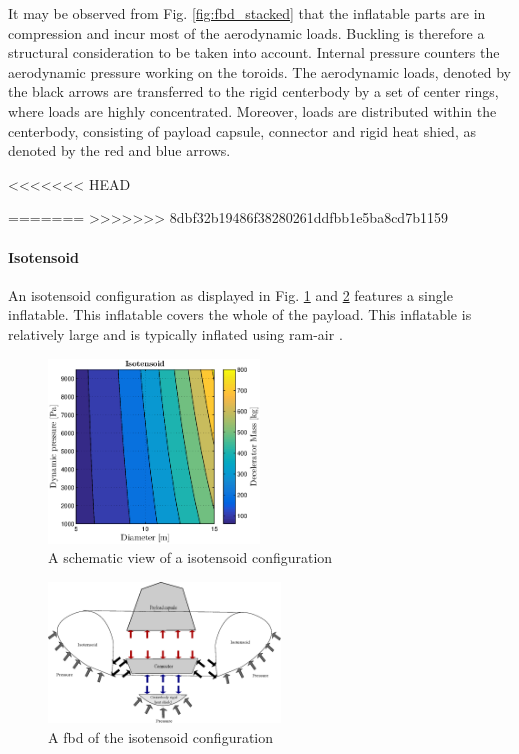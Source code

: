 It may be observed from Fig. \ref{fig:fbd_stacked} that the inflatable parts are in compression and incur most of the aerodynamic loads. Buckling is therefore a structural consideration to be taken into account. Internal pressure counters the aerodynamic pressure working on the toroids. The aerodynamic loads, denoted by the black arrows are transferred to the rigid centerbody by a set of center rings, where loads are highly concentrated. Moreover, loads are distributed within the centerbody, consisting of payload capsule, connector and rigid heat shied, as denoted by the red and blue arrows.

<<<<<<< HEAD

=======
>>>>>>> 8dbf32b19486f38280261ddfbb1e5ba8cd7b1159
\paragraph{Isotensoid}

An isotensoid configuration as displayed in Fig. \ref{fig:conc_iso} and \ref{fig:fbd_iso} features a single inflatable. This inflatable covers the whole of the payload. This inflatable is relatively large and is typically inflated using ram-air \cite{Smith2011}. 

\begin{figure}[H]
\centering
\includegraphics[width = 0.5\textwidth]{Figure/ISO_comp.eps}
\caption{A schematic view of a isotensoid configuration}
\label{fig:conc_iso}
\end{figure}

\begin{figure}[H]
\centering
\includegraphics[width = 0.55\textwidth]{Figure/FBD_isotensoid.eps}
\caption{A \gls{fbd} of the isotensoid configuration}
\label{fig:fbd_iso}
\end{figure}


